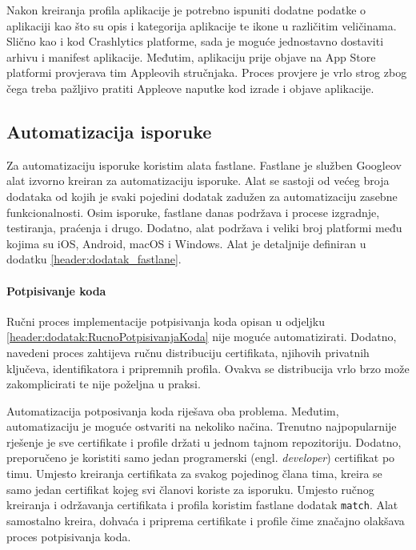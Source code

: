 \documentclass[times, utf8, diplomski, numeric]{fer}
\newcommand{\eng}[1]{(engl. \textit{#1})}
\begin{document}
\begin{appendices}
Nakon kreiranja profila aplikacije je potrebno ispuniti dodatne podatke o aplikaciji kao što su opis i kategorija aplikacije te ikone u različitim veličinama. Slično kao i kod Crashlytics platforme, sada je moguće jednostavno dostaviti arhivu i manifest aplikacije. Međutim, aplikaciju prije objave na App Store platformi provjerava tim Appleovih stručnjaka. Proces provjere je vrlo strog zbog čega treba pažljivo pratiti Appleove naputke kod izrade i objave aplikacije.

\subsection{Automatizacija isporuke}

Za automatizaciju isporuke koristim alata fastlane. Fastlane je služben Googleov alat izvorno kreiran za automatizaciju isporuke. Alat se sastoji od većeg broja dodataka od kojih je svaki pojedini dodatak zadužen za automatizaciju zasebne funkcionalnosti. Osim isporuke, fastlane danas podržava i procese izgradnje, testiranja, praćenja i drugo. Dodatno, alat podržava i veliki broj platformi među kojima su iOS, Android, macOS i Windows. Alat je detaljnije definiran u dodatku \ref{header:dodatak_fastlane}.

\paragraph{Potpisivanje koda} \label{header:dodatak:AutomatizacijaPotpisivanjaKoda}

Ručni proces implementacije potpisivanja koda opisan u odjeljku \ref{header:dodatak:RucnoPotpisivanjaKoda} nije moguće automatizirati. Dodatno, navedeni proces zahtijeva ručnu distribuciju certifikata, njihovih privatnih ključeva, identifikatora i pripremnih profila. Ovakva se distribucija vrlo brzo može zakomplicirati te nije poželjna u praksi.

Automatizacija potposivanja koda riješava oba problema. Međutim, automatizaciju je moguće ostvariti na nekoliko načina. Trenutno najpopularnije rješenje je sve certifikate i profile držati u jednom tajnom repozitoriju\citep{codesigningguide}. Dodatno, preporučeno je koristiti samo jedan programerski \eng{developer} certifikat po timu. Umjesto kreiranja certifikata za svakog pojedinog člana tima, kreira se samo jedan certifikat kojeg svi članovi koriste za isporuku. Umjesto ručnog kreiranja i održavanja certifikata i profila koristim fastlane dodatak \verb|match|\citep{fastlane:match}. Alat samostalno kreira, dohvaća i priprema certifikate i profile čime značajno olakšava proces potpisivanja koda.


\end{appendices}
\end{document}
